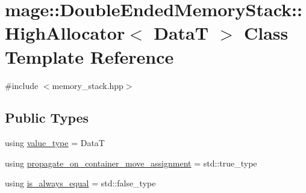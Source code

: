 \hypertarget{classmage_1_1_double_ended_memory_stack_1_1_high_allocator}{}\section{mage\+:\+:Double\+Ended\+Memory\+Stack\+:\+:High\+Allocator$<$ DataT $>$ Class Template Reference}
\label{classmage_1_1_double_ended_memory_stack_1_1_high_allocator}


{\ttfamily \#include $<$memory\+\_\+stack.\+hpp$>$}

\subsection*{Public Types}
\begin{DoxyCompactItemize}
\item 
using \hyperlink{classmage_1_1_double_ended_memory_stack_1_1_high_allocator_a43b87cea37b3bbba57ca794e9785e82d}{value\+\_\+type} = DataT
\item 
using \hyperlink{classmage_1_1_double_ended_memory_stack_1_1_high_allocator_a62088aeffb56b35539d9080aabc43134}{propagate\+\_\+on\+\_\+container\+\_\+move\+\_\+assignment} = std\+::true\+\_\+type
\item 
using \hyperlink{classmage_1_1_double_ended_memory_stack_1_1_high_allocator_af6ec362496ffae52532f1bb57170edf7}{is\+\_\+always\+\_\+equal} = std\+::false\+\_\+type
\end{DoxyCompactItemize}

